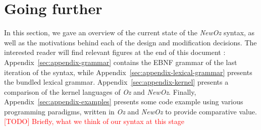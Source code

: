 \section{Going further}\label{sec:ch2-evaluation}
In this section, we gave an overview of the current state of the \textit{NewOz} syntax, as well as the motivations behind each of the design and modification decisions.
The interested reader will find relevant figures at the end of this document : Appendix~\ref{sec:appendix-grammar} contains the EBNF grammar of the last iteration of the syntax, while Appendix~\ref{sec:appendix-lexical-grammar} presents the bundled lexical grammar.
Appendix~\ref{sec:appendix-kernel} presents a comparison of the kernel languages of \textit{Oz} and \textit{NewOz}.
Finally, Appendix~\ref{sec:appendix-examples} presents some code example using various programming paradigms, written in \textit{Oz} and \textit{NewOz} to provide comparative value.\newline
\textcolor{red}{[TODO] Briefly, what we think of our syntax at this stage}